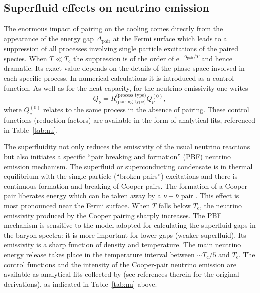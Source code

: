 \documentclass[smallextended]{svjour3}       %
\newcommand{\beq}{\begin{equation}}
\newcommand{\eeq}{\end{equation}}
\newcommand{\Tc}{T_\mathrm{c}}
\begin{document}
\subsection{Superfluid effects on neutrino emission}
\label{sect:SFnu}

The enormous impact of pairing on the cooling comes directly
from the appearance of the energy gap $\Delta_\mathrm{pair}$
at the Fermi surface which leads to a suppression of all
processes involving single particle excitations of the
paired species. When $T\ll\Tc$ the suppression is of the
order of $\mathrm{e}^{-\Delta_\mathrm{pair}/T}$ and hence
dramatic. Its exact value depends on the details of the
phase space involved in each specific process. In numerical
calculations it is introduced as a control function. As well
as for the heat capacity, for the neutrino emissivity one
writes
\beq
   Q_\nu = R_\textrm{(pairing type)}^\textrm{(process type)}
   Q_\nu^{(0)},
\eeq
where $Q_\nu^{(0)}$ relates to the same process
in the absence of pairing. These control functions
(reduction factors) are available in the form of analytical
fits, referenced in Table~\ref{tab:nu}.

The superfluidity not only reduces the emissivity of the
usual neutrino reactions but also initiates a specific
``pair breaking and formation'' (PBF) neutrino emission
mechanism. The superfluid or superconducting condensate is
in thermal equilibrium with the single particle (``broken
pairs'') excitations and there is continuous formation and
breaking of Cooper pairs. The formation of a Cooper pair
liberates energy which can be taken away by a $\nu-\bar\nu$
pair \citep{FlowersRS76,VoskresenskySenatorov87}. This
effect is most pronounced near the Fermi surface. When $T$
falls below $\Tc$, the neutrino emissivity produced by the
Cooper pairing sharply increases. The PBF mechanism is
sensitive to the model adopted for calculating the
superfluid gaps in the baryon spectra: it is more important
for lower gaps (weaker superfluid). Its emissivity is a
sharp function of density and temperature. The main neutrino
energy release takes place in the temperature interval
between $\sim\Tc/5$ and $\Tc$. The control functions and the
intensity of the Cooper-pair neutrino emission are available
as analytical fits collected by \citet{YKGH01} (see
references therein for the original derivations), as
indicated in Table~\ref{tab:nu} above.
\end{document}
